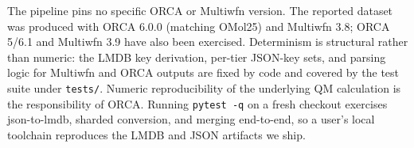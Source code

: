 The pipeline pins no specific ORCA or Multiwfn version. The reported dataset was produced
with ORCA 6.0.0 (matching OMol25) and Multiwfn 3.8; ORCA 5/6.1 and Multiwfn 3.9 have also
been exercised. Determinism is structural rather than numeric: the LMDB key derivation,
per-tier JSON-key sets, and parsing logic for Multiwfn and ORCA outputs are fixed by code
and covered by the test suite under \texttt{tests/}. Numeric reproducibility of the
underlying QM calculation is the responsibility of ORCA. Running \texttt{pytest -q} on a
fresh checkout exercises json-to-lmdb, sharded conversion, and merging end-to-end, so a
user's local toolchain reproduces the LMDB and JSON artifacts we ship.

